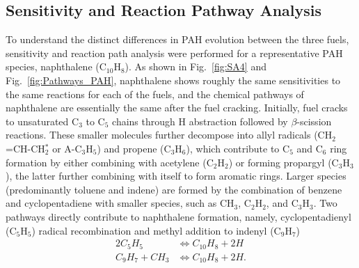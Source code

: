 \documentclass[review,3p,times]{elsarticleUS}
\begin{document}
\subsection{Sensitivity and Reaction Pathway Analysis}

To understand the distinct differences in PAH evolution between the three fuels, sensitivity and reaction path analysis were performed for a representative PAH species, naphthalene (C$_{10}$H$_8$). As shown in Fig.~\ref{fig:SA4} and Fig.~\ref{fig:Pathways_PAH}, naphthalene shows roughly the same sensitivities to the same reactions for each of the fuels, and the chemical pathways of naphthalene are essentially the same after the fuel cracking. Initially, fuel cracks to unsaturated C$_3$ to C$_5$ chains through H abstraction followed by $\beta$-scission reactions. These smaller molecules further decompose into allyl radicals (CH$_2$=CH-CH$_2^*$ or A-C$_3$H$_5$) and propene (C$_3$H$_6$), which contribute to C$_5$ and C$_6$ ring formation by either combining with acetylene (C$_2$H$_2$) or forming propargyl (C$_3$H$_3$), the latter further combining with itself to form aromatic rings. Larger species (predominantly toluene and indene) are formed by the combination of benzene and cyclopentadiene with smaller species, such as 
CH$_3$, C$_2$H$_2$, and C$_3$H$_3$. Two pathways directly contribute to naphthalene formation, namely, cyclopentadienyl (C$_5$H$_5$) radical recombination and methyl addition to indenyl (C$_9$H$_7$)
\begin{align*}
  2 C_5H_5 &\Longleftrightarrow C_{10}H_8 + 2 H\\
  C_9H_7 + CH_3 &\Longleftrightarrow C_{10}H_8 + 2 H.
\end{align*}
\end{document}
